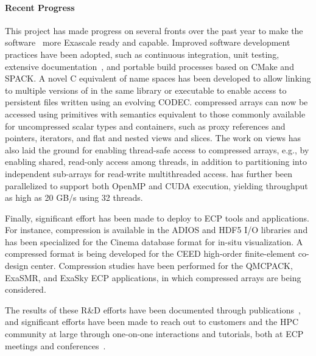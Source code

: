 \paragraph{Recent Progress}

This project has made progress on several fronts over the past year to make
the {\zfp} software~\cite{zfp-code} more Exascale ready and capable.
Improved software development practices have been adopted, such as continuous
integration, unit testing, extensive documentation~\cite{zfp-docs}, and
portable build processes based on CMake and SPACK.  A novel C equivalent of
name spaces has been developed to allow linking to multiple versions of {\zfp}
in the same library or executable to enable access to persistent files written
using an evolving {\zfp} CODEC.
{\zfp} compressed arrays can now be accessed using primitives with
semantics equivalent to those commonly available for uncompressed scalar
types and containers, such as proxy references and pointers, iterators,
and flat and nested views and slices.
The work on views has also laid the ground for enabling
thread-safe access to {\zfp} compressed arrays, e.g., by enabling
shared, read-only access among threads, in addition to partitioning into
independent sub-arrays for read-write multithreaded access.  {\zfp} has
further been parallelized to support both OpenMP and CUDA execution,
yielding throughput as high as 20 GB/s using 32 threads.

Finally, significant effort has been made to deploy {\zfp} to ECP tools
and applications.  For instance, {\zfp} compression is available in the
ADIOS and HDF5 I/O libraries and has been specialized for the Cinema
database format for in-situ visualization.  A compressed
format is being developed for the CEED high-order finite-element co-design
center.  Compression studies have been performed for the QMCPACK, ExaSMR,
and ExaSky ECP applications, in which {\zfp} compressed arrays are being
considered.

The results of these R\&D efforts have been documented through
publications~\cite{zfp-isc2017,zfp-jsm2017}, and significant efforts have
been made to reach out to customers and the HPC community at large through
one-on-one interactions and tutorials, both at ECP meetings and
conferences~\cite{zfp-isc2017-tut,zfp-sc2017-tut,zfp-ep2018-tut}.

